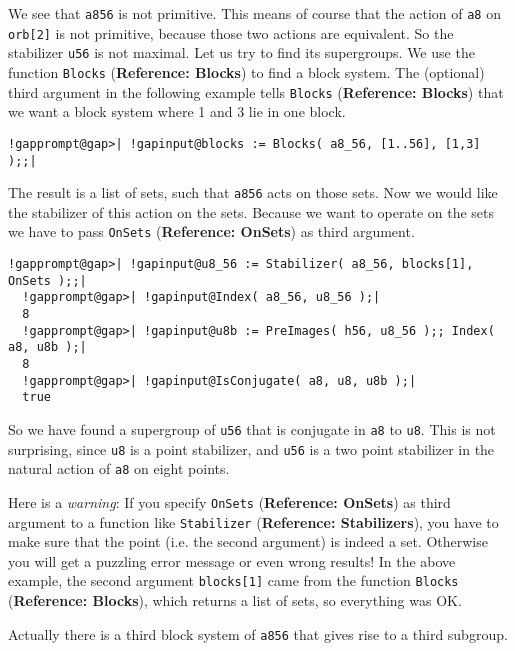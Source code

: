 \documentclass[a4paper,11pt]{report}
\begin{document}
{{ We see that \texttt{a8{\textunderscore}56} is not primitive. This means of course that the action of \texttt{a8} on \texttt{orb[2]} is not primitive, because those two actions are equivalent. So the stabilizer \texttt{u56} is not maximal. Let us try to find its supergroups. We use the function \texttt{Blocks} (\textbf{Reference: Blocks}) to find a block system. The (optional) third argument in the following example
tells \texttt{Blocks} (\textbf{Reference: Blocks}) that we want a block system where 1 and 3 lie in one block. 

 
\begin{Verbatim}[commandchars=!@|,fontsize=\small,frame=single,label=Example]
  !gapprompt@gap>| !gapinput@blocks := Blocks( a8_56, [1..56], [1,3] );;|
\end{Verbatim}
 

 The result is a list of sets, such that \texttt{a8{\textunderscore}56} acts on those sets. Now we would like the stabilizer of this action on the
sets. Because we want to operate on the sets we have to pass \texttt{OnSets} (\textbf{Reference: OnSets}) as third argument. 

 
\begin{Verbatim}[commandchars=!@|,fontsize=\small,frame=single,label=Example]
  !gapprompt@gap>| !gapinput@u8_56 := Stabilizer( a8_56, blocks[1], OnSets );;|
  !gapprompt@gap>| !gapinput@Index( a8_56, u8_56 );|
  8
  !gapprompt@gap>| !gapinput@u8b := PreImages( h56, u8_56 );; Index( a8, u8b );|
  8
  !gapprompt@gap>| !gapinput@IsConjugate( a8, u8, u8b );|
  true
\end{Verbatim}
 

 So we have found a supergroup of \texttt{u56} that is conjugate in \texttt{a8} to \texttt{u8}. This is not surprising, since \texttt{u8} is a point stabilizer, and \texttt{u56} is a two point stabilizer in the natural action of \texttt{a8} on eight points. 

 Here is a \emph{warning}: If you specify \texttt{OnSets} (\textbf{Reference: OnSets}) as third argument to a function like \texttt{Stabilizer} (\textbf{Reference: Stabilizers}), you have to make sure that the point (i.e. the second argument) is indeed a
set. Otherwise you will get a puzzling error message or even wrong results! In
the above example, the second argument \texttt{blocks[1]} came from the function \texttt{Blocks} (\textbf{Reference: Blocks}), which returns a list of sets, so everything was OK. 

 Actually there is a third block system of \texttt{a8{\textunderscore}56} that gives rise to a third subgroup. 

}}
\end{document}

